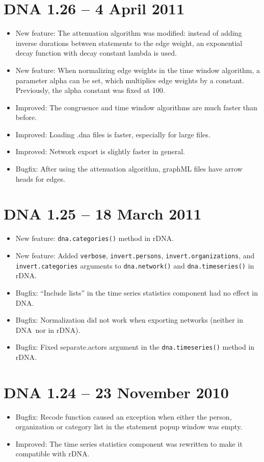 \documentclass[12pt,a4paper]{scrreprt}
\newcommand{\dnashort}{\textsc{DNA}}
\newcommand{\code}[1]{\texttt{#1}}
\begin{document}
\section*{DNA 1.26 -- 4 April 2011}
\begin{itemize}
 \item New feature: The attenuation algorithm was modified: instead of adding inverse durations between statements to the edge weight, an exponential decay function with decay constant lambda is used.
 \item New feature: When normalizing edge weights in the time window algorithm, a parameter alpha can be set, which multiplies edge weights by a constant. Previously, the alpha constant was fixed at 100.
 \item Improved: The congruence and time window algorithms are much faster than before.
 \item Improved: Loading .dna files is faster, especially for large files.
 \item Improved: Network export is slightly faster in general.
 \item Bugfix: After using the attenuation algorithm, graphML files have arrow heads for edges.
\end{itemize}

\section*{DNA 1.25 -- 18 March 2011}
\begin{itemize}
 \item New feature: \code{dna.categories()} method in rDNA.
 \item New feature: Added \code{verbose}, \code{invert.persons}, \code{invert.organizations}, and \code{invert.categories} arguments to \code{dna.network()} and \code{dna.timeseries()} in rDNA.
 \item Bugfix: ``Include lists'' in the time series statistics component had no effect in \dnashort.
 \item Bugfix: Normalization did not work when exporting networks (neither in \dnashort\ nor in rDNA).
 \item Bugfix: Fixed separate.actors argument in the \code{dna.timeseries()} method in rDNA.
\end{itemize}

\section*{DNA 1.24 -- 23 November 2010}
\begin{itemize}
 \item Bugfix: Recode function caused an exception when either the person, organization or category list in the statement popup window was empty.
 \item Improved: The time series statistics component was rewritten to make it compatible with rDNA.
\end{itemize}
\end{document}
